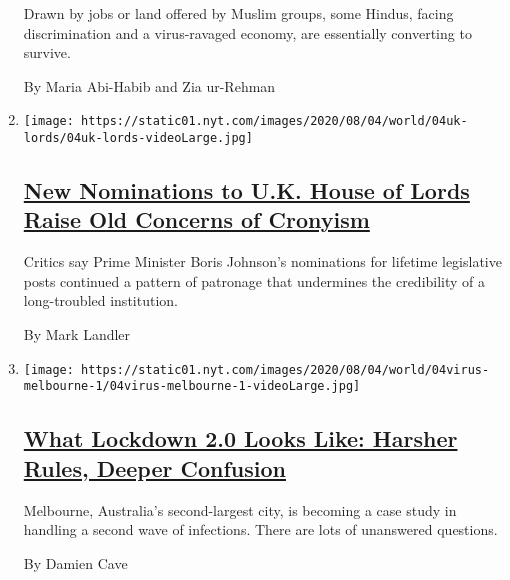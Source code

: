 \begin{enumerate}
  Drawn by jobs or land offered by Muslim groups, some Hindus, facing
  discrimination and a virus-ravaged economy, are essentially converting
  to survive.

  By Maria Abi-Habib and Zia ur-Rehman
\item
  \texttt{[image: https://static01.nyt.com/images/2020/08/04/world/04uk-lords/04uk-lords-videoLarge.jpg]}

  \hypertarget{new-nominations-to-uk-house-of-lords-raise-old-concerns-of-cronyism}{%
  \subsection{\texorpdfstring{\href{/2020/08/04/world/house-of-lords-boris-johnson.html}{New
  Nominations to U.K. House of Lords Raise Old Concerns of
  Cronyism}}{New Nominations to U.K. House of Lords Raise Old Concerns of Cronyism}}\label{new-nominations-to-uk-house-of-lords-raise-old-concerns-of-cronyism}}

  Critics say Prime Minister Boris Johnson's nominations for lifetime
  legislative posts continued a pattern of patronage that undermines the
  credibility of a long-troubled institution.

  By Mark Landler
\item
  \texttt{[image: https://static01.nyt.com/images/2020/08/04/world/04virus-melbourne-1/04virus-melbourne-1-videoLarge.jpg]}

  \hypertarget{what-lockdown-20-looks-like-harsher-rules-deeper-confusion}{%
  \subsection{\texorpdfstring{\href{/2020/08/04/world/australia/coronavirus-melbourne-lockdown.html}{What
  Lockdown 2.0 Looks Like: Harsher Rules, Deeper
  Confusion}}{What Lockdown 2.0 Looks Like: Harsher Rules, Deeper Confusion}}\label{what-lockdown-20-looks-like-harsher-rules-deeper-confusion}}

  Melbourne, Australia's second-largest city, is becoming a case study
  in handling a second wave of infections. There are lots of unanswered
  questions.

  By Damien Cave
\end{enumerate}


